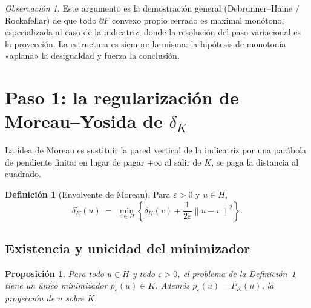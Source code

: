 \documentclass[11pt,a4paper]{article}
\newtheorem{proposicion}[teorema]{Proposición}
\theoremstyle{definition}
\newtheorem{definicion}[teorema]{Definición}
\theoremstyle{remark}
\newtheorem{observacion}[teorema]{Observación}
\newcommand{\Norm}[1]{\left\lVert #1 \right\rVert}
\newcommand{\dk}{\delta_K}
\newcommand{\dke}{\delta_K^\varepsilon}
\newcommand{\pk}{P_K}
\begin{document}
\begin{observacion}
Este argumento es la demostración general (Debrunner--Haine / Rockafellar)
de que todo $\partial F$ convexo propio cerrado es maximal monótono,
especializada al caso de la indicatriz, donde la resolución del paso
variacional es la proyección. La estructura es siempre la misma: la
hipótesis de monotonía «aplana» la desigualdad y fuerza la conclusión.
\end{observacion}

\section{Paso 1: la regularización de Moreau--Yosida de $\delta_K$}

La idea de Moreau es sustituir la pared vertical de la indicatriz por una
parábola de pendiente finita: en lugar de pagar $+\infty$ al salir de $K$,
se paga la distancia al cuadrado.

\begin{definicion}[Envolvente de Moreau]\label{def:envolvente}
Para $\varepsilon > 0$ y $u \in H$,
\[
\dke(u)
\;=\; \min_{v \in H} \left\{ \dk(v) + \frac{1}{2\varepsilon}\Norm{u - v}^2 \right\}.
\]
\end{definicion}

\subsection{Existencia y unicidad del minimizador}

\begin{proposicion}\label{prop:existencia}
Para todo $u \in H$ y todo $\varepsilon > 0$, el problema de la
Definición~\ref{def:envolvente} tiene un único minimizador
$p_\varepsilon(u) \in K$. Además $p_\varepsilon(u) = \pk(u)$, la proyección
de $u$ sobre $K$.
\end{proposicion}
\end{document}
